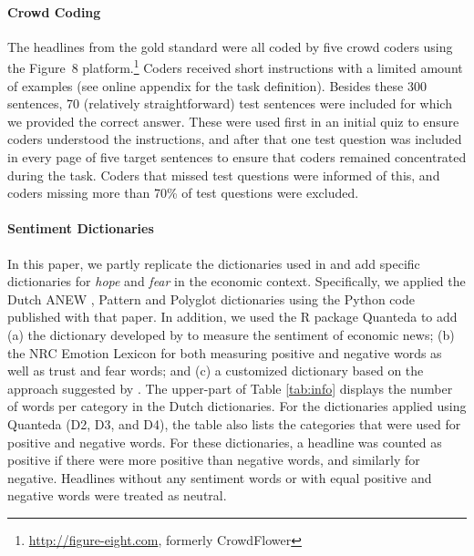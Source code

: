 \paragraph{Crowd Coding}
The headlines from the gold standard were all coded by five crowd coders using the Figure~8 platform.\footnote{\url{http://figure-eight.com}, formerly CrowdFlower} 
Coders received short instructions with a limited amount of examples (see online appendix for the task definition).
Besides these 300 sentences, 70 (relatively straightforward) test sentences were included for which we provided the correct answer.
These were used first in an initial quiz to ensure coders understood the instructions, and after that one test question was included in every page of five target sentences to ensure that coders remained concentrated during the task. Coders that missed test questions were informed of this, and coders missing more than 70\% of test questions were excluded. 


\paragraph{Sentiment Dictionaries} 
In this paper, we partly replicate the dictionaries used in \cite{boukes2019} and add specific dictionaries for \textit{hope} and \textit{fear} in the economic context.
Specifically, we applied the Dutch ANEW \citep{anew}, Pattern \citep{pattern} and Polyglot \citep{polyglot} dictionaries 
using the Python code published with that paper. 
In addition, we used the R package Quanteda \citep{quanteda} to add 
(a) the dictionary developed by \cite{damstra2018} to measure the sentiment of economic news; 
(b) the NRC Emotion Lexicon \citep{mohammad2013} for both measuring positive and negative words as well as trust and fear words; 
and (c) a customized dictionary based on the approach suggested by \cite{muddiman2019}.
The upper-part of Table \ref{tab:info} displays the number of words per category in the Dutch dictionaries.
For the dictionaries applied using Quanteda (D2, D3, and D4), 
the table also lists the categories that were used for positive and negative words. 
For these dictionaries, a headline was counted as positive if there were more positive than negative words, and similarly for negative.
Headlines without any sentiment words or with equal positive and negative words were treated as neutral. 


